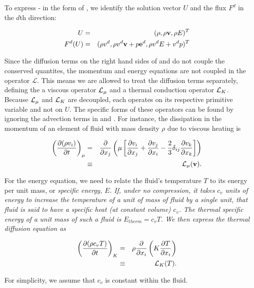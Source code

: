 \noindent
To express  -  in the form of 
, we identify the solution vector $U$ and the flux 
$F^d$ in the $d$th direction:

\begin{eqnarray}
U &=& (\rho, \rho\mathbf{v}, \rho E)^T \label{eq:solnVector} \\
F^d(U) &=& (\rho v^d, \rho v^d\mathbf{v} + p\mathbf{e}^d,\rho v^d E + v^d p)^T \label{eq:Fd}
\end{eqnarray}

\noindent
Since the diffusion terms on the right hand sides of  and 
 do not couple the conserved quantites, the momentum and energy 
equations are not coupled in the operator $\mathcal{L}$. This means we are 
allowed to treat the diffusion terms separately, defining the a viscous 
operator $\mathcal{L}_\mu$ and a thermal conduction operator $\mathcal{L}_K$. Because $\mathcal{L}_\mu$ and 
$\mathcal{L}_K$ are decoupled, each operates on its respective primitive variable and 
not on $U$. The specific forms of these operators can be found by ignoring 
the advection terms in  and .  For instance, the 
dissipation in the momentum of an element of fluid with mass density $\rho$ 
due to viscous heating is

\begin{eqnarray}
\left(\frac{\partial (\rho v_i)}{\partial t}\right)_{\mu} &=& \frac{\partial }{\partial x_j}\left(\mu\left[\frac{\partial v_i}{\partial x_j} + \frac{\partial v_j}{\partial x_i} - \frac{2}{3}\delta_{ij}\frac{\partial v_k}{\partial x_k}\right]\right) \notag \\
                                    &\equiv& \mathcal{L}_\mu(\mathbf{v}). \label{eq:Lmu}
\end{eqnarray}

\noindent
For the energy equation, we need to relate the fluid's temperature $T$ to its 
energy per unit mass, or \em specific energy\em, $E$. If, under no compression, 
it takes $c_v$ units of energy to increase the temperature of a unit of mass of 
fluid by a single unit, that fluid is said to have a specific heat (at constant 
volume) $c_v$. The thermal specific energy of a unit mass of such a fluid is 
$E_{therm} = c_v T$.  We then express the thermal diffusion equation as

\begin{eqnarray}
\left(\frac{\partial (\rho c_v T)}{\partial t}\right)_K &=& \rho\frac{\partial }{\partial x_i}\left(K\frac{\partial T}{\partial x_i}\right) \notag \\
                                      &\equiv& \mathcal{L}_K(T). \label{eq:LK}
\end{eqnarray}

\noindent
For simplicity, we assume that $c_v$ is constant within the fluid.  

